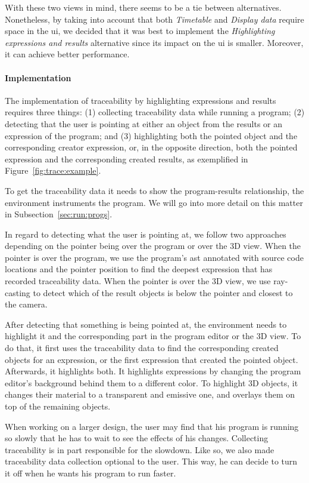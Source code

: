 With these two views in mind, there seems to be a tie between alternatives.
Nonetheless, by taking into account that both {\it Timetable} and {\it Display data} require space in the \gls{ui}, we decided that it was best to implement the {\it Highlighting expressions and results} alternative since its impact on the \gls{ui} is smaller.
Moreover, it can achieve better performance.

\paragraph{Implementation}
The implementation of traceability by highlighting expressions and results requires three things:
(1) collecting traceability data while running a program;
(2) detecting that the user is pointing at either an object from the results or an expression of the program;
and (3) highlighting both the pointed object and the corresponding creator expression, or, in the opposite direction, both the pointed expression and the corresponding created results, as exemplified in Figure~\ref{fig:trace:example}.

To get the traceability data it needs to show the program-results relationship, the environment instruments the program.
We will go into more detail on this matter in Subsection~\ref{sec:run:progs}.

In regard to detecting what the user is pointing at, we follow two approaches depending on the pointer being over the program or over the 3D view.
When the pointer is over the program, we use the program's \gls{ast} annotated with source code locations and the pointer position to find the deepest expression that has recorded traceability data.
When the pointer is over the 3D view, we use ray-casting to detect which of the result objects is below the pointer and closest to the camera.

After detecting that something is being pointed at, the environment needs to highlight it and the corresponding part in the program editor or the 3D view.
To do that, it first uses the traceability data to find the corresponding created objects for an expression, or the first expression that created the pointed object.
Afterwards, it highlights both.
It highlights expressions by changing the program editor's background behind them to a different color.
To highlight 3D objects, it changes their material to a transparent and emissive one, and overlays them on top of the remaining objects.

When working on a larger design, the user may find that his program is running so slowly that he has to wait to see the effects of his changes.
Collecting traceability is in part responsible for the slowdown.
Like so, we also made traceability data collection optional to the user.
This way, he can decide to turn it off when he wants his program to run faster.

